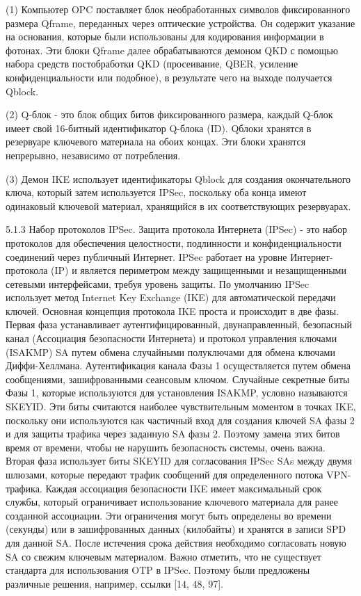(1) Компьютер OPC поставляет блок необработанных символов фиксированного размера Qframe, переданных через оптические устройства. Он содержит указание на основания, которые были использованы для кодирования информации в фотонах. Эти блоки Qframe далее обрабатываются демоном QKD с помощью набора средств постобработки QKD (просеивание, QBER, усиление конфиденциальности или подобное), в результате чего на выходе получается Qblock.

(2) Q-блок - это блок общих битов фиксированного размера, каждый Q-блок имеет свой 16-битный идентификатор Q-блока (ID). Qблоки хранятся в резервуаре ключевого материала на обоих концах. Эти блоки хранятся непрерывно, независимо от потребления.

(3) Демон IKE использует идентификаторы Qblock для создания окончательного ключа, который затем используется IPSec, поскольку оба конца имеют одинаковый ключевой материал, хранящийся в их соответствующих резервуарах.


5.1.3 Набор протоколов IPSec. Защита протокола Интернета (IPSec) - это набор протоколов для обеспечения целостности, подлинности и конфиденциальности соединений через публичный Интернет. IPSec работает на уровне Интернет-протокола (IP) и является периметром между защищенными и незащищенными сетевыми интерфейсами, требуя уровень защиты. По умолчанию IPSec использует метод Internet Key Exchange (IKE) для автоматической передачи ключей. Основная концепция протокола IKE проста и происходит в две фазы. Первая фаза устанавливает аутентифицированный, двунаправленный, безопасный канал (Ассоциация безопасности Интернета) и протокол управления ключами (ISAKMP) SA путем обмена случайными полуключами для обмена ключами Диффи-Хеллмана. Аутентификация канала Фазы 1 осуществляется путем обмена сообщениями, зашифрованными сеансовым ключом. Случайные секретные биты Фазы 1, которые используются для установления ISAKMP, условно называются SKEYID. Эти биты считаются наиболее чувствительным моментом в точках IKE, поскольку они используются как частичный вход для создания ключей SA фазы 2 и для защиты трафика через заданную SA фазы 2. Поэтому замена этих битов время от времени, чтобы не нарушить безопасность системы, очень важна.
Вторая фаза использует биты SKEYID для согласования IPSec SAs между двумя шлюзами, которые передают трафик сообщений для определенного потока VPN-трафика. Каждая ассоциация безопасности IKE имеет максимальный срок службы, который ограничивает использование ключевого материала для ранее созданной ассоциации. Эти ограничения могут быть определены во времени (секунды) или в зашифрованных данных (килобайты) и хранятся в записи SPD для данной SA. После истечения срока действия необходимо согласовать новую SA со свежим ключевым материалом. Важно отметить, что не существует стандарта для использования OTP в IPSec. Поэтому были предложены различные решения, например, ссылки [14, 48, 97].

